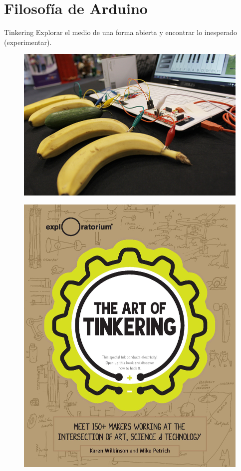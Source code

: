 \documentclass{beamer}
\begin{document}
	\section{Filosofía de Arduino}
		\begin{frame}{Tinkering}
			Explorar el medio de una forma abierta y encontrar lo inesperado (experimentar).
			\begin{multicols}{2}
				\begin{figure}
					\centering
					\includegraphics[scale=0.22]{tink1}
				\end{figure}
				\begin{figure}
					\centering
					\includegraphics[scale=0.19]{tink2}
				\end{figure}
			\end{multicols}
			
		\end{frame}
\end{document}
